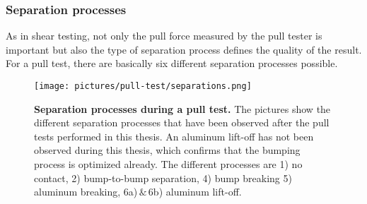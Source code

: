 \subsubsection{Separation processes}
As in shear testing, not only the pull force measured by the pull tester is important but also the type of separation process defines the quality of the result. For a pull test, there are basically six different separation processes possible.
\begin{figure}
\begin{center}
\texttt{[image: pictures/pull-test/separations.png]}
\end{center}
\caption[Possible separation processes during a pull test]{\textbf{Separation processes during a pull test.} The pictures show the different separation processes that have been observed after the pull tests performed in this thesis. An aluminum lift-off has not been observed during this thesis, which confirms that the bumping process is optimized already. The different processes are 1) no contact, 2) bump-to-bump separation, 4) bump breaking 5) aluminum breaking, 6a)$\,\&\,$6b) aluminum lift-off.}\label{pic:pull_separations}
\end{figure}
